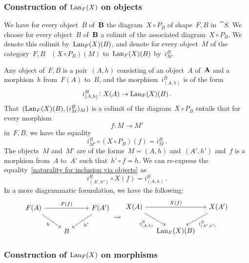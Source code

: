 \subsubsection*{Construction of $\operatorname{Lan}_F(X)$ on objects}

We have for every object~$B$ of~$\mathbf{B}$ the diagram~$X ∘ P_B$ of shape~$F \comma B$ in~$\cat{S}$.
We choose for every object~$B$ of~$\mathbf{B}$ a colimit of the associated diagram~$X ∘ P_B$.
We denote this colimit by~$\operatorname{Lan}_F(X)(B)$, and denote for every object~$M$ of the category~$F \comma B$ ~$(X ∘ P_B)(M)$ to~$\operatorname{Lan}_F(X)(B)$ by~$i^B_M$.

Any object of~$F \comma B$ is a pair~$(A, h)$ consisting of an object~$A$ of~$\mathbf{A}$ and a morphism~$h$ from~$F(A)$ to~$B$, and the morphism~$i^B_{(A, h)}$ is of the form
\[
	i^B_{(A, h)} \colon X(A) \to \operatorname{Lan}_F(X)(B) \,.
\]
That~$(\operatorname{Lan}_F(X)(B), (i^B_M)_M)$ is a colimit of the diagram~$X ∘ P_B$ entails that for every morphism
\[
	f \colon M \to M'
\]
in~$F \comma B$, we have the equality
\begin{equation}
	\label{naturality for inclusion via objects}
	i^B_{M'} ∘ (X ∘ P_B)(f) = i^B_M \,.
\end{equation}
The objects~$M$ and~$M'$ are of the forms~$M = (A, h)$ and~$(A', h')$ and~$f$ is a morphism from~$A$ to~$A'$ such that~$h' ∘ f = h$.
We can re-express the equality~\eqref{naturality for inclusion via objects} as
\begin{equation}
	\label{naturality for inclusion via objects explicit}
	i^B_{(A', h')} ∘ X(f) = i^B_{(A, h)} \,.
\end{equation}
In a more diagrammatic formulation, we have the following:
\[
	\begin{tikzcd}[column sep = normal]
		F(A)
		\arrow{rr}[above]{F(f)}
		\arrow{dr}[below left]{h}
		&
		{}
		&
		F(A')
		\arrow{dl}[below right]{h'}
		\\
		{}
		&
		B
		&
		{}
	\end{tikzcd}
	\leadsto
	\begin{tikzcd}[column sep = small]
		X(A)
		\arrow{rr}[above]{X(f)}
		\arrow{dr}[below left]{i^B_{(A, h)}}
		&
		{}
		&
		X(A')
		\arrow{dl}[below right]{i^B_{(A', h')}}
		\\
		{}
		&
		\Lan_F(X)(B)
		&
		{}
	\end{tikzcd}
\]

\subsubsection*{Construction of $\operatorname{Lan}_F(X)$ on morphisms}

